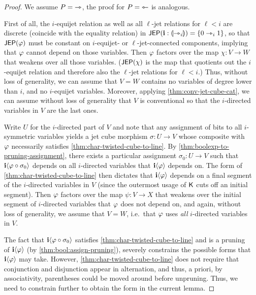 \documentclass[a4paper]{memoir}
\begin{document}
\begin{proof}
	We assume $P = {\rightarrowtriangle}$, the proof for $P = {\leftarrowtriangle}$ is analogous.

	First of all, the $i$-equijet relation as well as all $\ell$-jet relations for $\ell < i$ are discrete (coincide with the equality relation) in $\mathsf{JEP}(\mathbf{i} : {\llparenthesis \rightarrowtriangle_i \rrparenthesis}) = \mathopen{}\left\{ 0 \rightarrowtriangle_i 1 \right\}\mathclose{}$, so that $\mathsf{JEP}(\varphi)$ must be constant on $i$-equijet- or $\ell$-jet-connected components, implying that $\varphi$ cannot depend on those variables.
	Then $\varphi$ factors over the map $\chi : V \to W$ that weakens over all those variables.
	($\mathsf{JEP}(\chi)$ is the map that quotients out the $i$-equijet relation and therefore also the $\ell$-jet relations for $\ell < i$.)
	Thus, without loss of generality, we can assume that $V = W$ contains no variables of degree lower than $i$, and no $i$-equijet variables.
	Moreover, applying \cref{thm:conv-jet-cube-cat}, we can assume without loss of generality that $V$ is conventional so that the $i$-directed variables in $V$ are the last ones.
	
	Write $U$ for the $i$-directed part of $V$ and note that any assignment of bits to all $i$-symmetric variables yields a jet cube morphism $\sigma : U \to V$ whose composite with $\varphi$ necessarily satisfies \cref{thm:char-twisted-cube-to-line}.
	By \cref{thm:boolexp-to-pruning-assignment}, there exists a particular assignment $\sigma_0 : U \to V$ such that $\mathbf{i} \langle \varphi \circ \sigma_0 \rangle$ depends on all $i$-directed variables that $\mathbf{i} \langle \varphi \rangle$ depends on.
	The form of \cref{thm:char-twisted-cube-to-line} then dictates that $\mathbf{i} \langle \varphi \rangle$ depends on a final segment of the $i$-directed variables in $V$ (since the outermost usage of $\mathbin{\mathsf{K}}$ cuts off an initial segment).
	Then $\varphi$ factors over the map $\psi : V \to X$ that weakens over the initial segment of $i$-directed variables that $\varphi$ does not depend on, and again, without loss of generality, we assume that $V = W$, i.e.\ that $\varphi$ uses \emph{all} $i$-directed variables in $V$.
	
	The fact that $\mathbf{i} \langle \varphi \circ \sigma_0 \rangle$ satisfies \cref{thm:char-twisted-cube-to-line} and is a pruning of $\mathbf{i} \langle \varphi \rangle$ (by \cref{thm:bool:assign-pruning}), severely constrains the possible forms that $\mathbf{i} \langle \varphi \rangle$ may take.
	However, \cref{thm:char-twisted-cube-to-line} does not require that conjunction and disjunction appear in alternation, and thus, a priori, by associativity, parentheses could be moved around before unpruning.
	Thus, we need to constrain further to obtain the form in the current lemma.
	

\end{proof}
\end{document}
